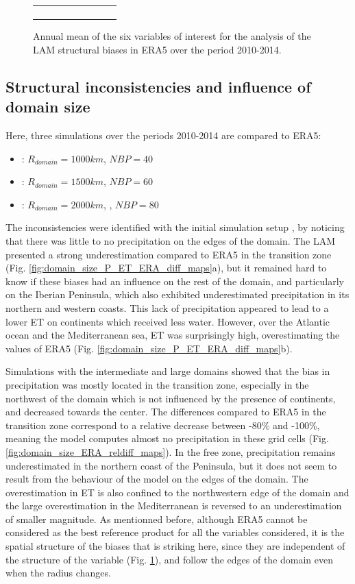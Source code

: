 \begin{figure}[htbp]
\begin{tabular}{ccc}
\begin{subfigure}[b]{0.33\textwidth}
        \end{subfigure}
    \end{tabular}
    \caption{Annual mean of the six variables of interest for the analysis of the LAM structural biases in ERA5 over the period 2010-2014.}
    \label{fig:ERA_var_maps}
\end{figure}

\subsection{Structural inconsistencies and influence of domain size}
\label{sec:domain_size}
Here, three simulations over the periods 2010-2014 are compared to ERA5:
\begin{itemize}
    \item \smalld : $R_{domain} = 1000 km$, $NBP=40$
    \item \interd : $R_{domain} = 1500 km$, $NBP=60$
    \item \larged : $R_{domain} = 2000 km$, , $NBP=80$
\end{itemize}

The inconsistencies were identified with the initial simulation setup \smalld, by noticing that there was little to no precipitation on the edges of the domain. The LAM presented a strong underestimation compared to ERA5 in the transition zone (Fig. \ref{fig:domain_size_P_ET_ERA_diff_maps}a), but it remained hard to know if these biases had an influence on the rest of the domain, and particularly on the Iberian Peninsula, which also exhibited underestimated precipitation in its northern and western coasts.
This lack of precipitation appeared to lead to a lower ET on continents which received less water. However, over the Atlantic ocean and the Mediterranean sea, ET was surprisingly high, overestimating the values of ERA5 (Fig. \ref{fig:domain_size_P_ET_ERA_diff_maps}b). 

Simulations with the intermediate and large domains showed that the bias in precipitation was mostly located in the transition zone, especially in the northwest of the domain which is not influenced by the presence of continents, and decreased towards the center. 
The differences compared to ERA5 in the transition zone correspond to a relative decrease between -80\% and -100\%, meaning the model computes almost no precipitation in these grid cells (Fig. \ref{fig:domain_size_ERA_reldiff_maps}).
In the free zone, precipitation remains underestimated in the northern coast of the Peninsula, but it does not seem to result from the behaviour of the model on the edges of the domain.
The overestimation in ET is also confined to the northwestern edge of the domain and the large overestimation in the Mediterranean is reversed to an underestimation of smaller magnitude.
As mentionned before, although ERA5 cannot be considered as the best reference product for all the variables considered, it is the spatial structure of the biases that is striking here, since they are independent of the structure of the variable (Fig. \ref{fig:ERA_var_maps}), and follow the edges of the domain even when the radius changes.

